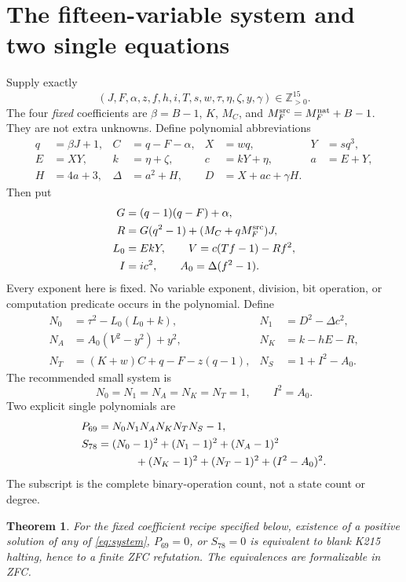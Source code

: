 \documentclass[11pt]{article}
\newtheorem{theorem}{Theorem}
\newcommand{\Pos}{\mathbb Z_{>0}}
\begin{document}
\section{The fifteen-variable system and two single equations}
Supply exactly
\[
(J,F,\alpha,z,f,h,i,T,s,w,\tau,\eta,\zeta,y,\gamma)\in\Pos^{15}.
\]
The four \emph{fixed} coefficients are $\beta=B-1$, $K$, $M_C$, and
$M_F^{\rm src}=M_F^{\rm nat}+B-1$. They are not extra unknowns.
Define polynomial abbreviations
\begin{align*}
q&=\beta J+1,&C&=q-F-\alpha,&X&=wq,&Y&=sq^3,\\
E&=XY,&k&=\eta+\zeta,&c&=kY+\eta,&a&=E+Y,\\
H&=4a+3,&\Delta&=a^2+H,&D&=X+ac+\gamma H.
\end{align*}
Then put
\begin{align*}
G&=(q-1)(q-F)+\alpha,\\
R&=G(q^2-1)+(M_C+qM_F^{\rm src})J,\\
L_0&=EkY,\qquad V=c(Tf-1)-Rf^2,\\
I&=ic^2,\qquad A_0=\Delta(f^2-1).
\end{align*}
Every exponent here is fixed. No variable exponent, division, bit operation, or computation predicate occurs in the polynomial. Define
\begin{align*}
N_0&=\tau^2-L_0(L_0+k),& N_1&=D^2-\Delta c^2,\\
N_A&=A_0(V^2-y^2)+y^2,& N_K&=k-hE-R,\\
N_T&=(K+w)C+q-F-z(q-1),&N_S&=1+I^2-A_0.
\end{align*}
The recommended small system is
\begin{equation}\label{eq:system}
\boxed{N_0=N_1=N_A=N_K=N_T=1,\qquad I^2=A_0.}
\end{equation}
Two explicit single polynomials are
\begin{align}
P_{69}&=N_0N_1N_AN_KN_TN_S-1,\label{eq:product}\\
S_{78}&=(N_0-1)^2+(N_1-1)^2+(N_A-1)^2\notag\\
&\hspace{12mm}+(N_K-1)^2+(N_T-1)^2+(I^2-A_0)^2.\label{eq:sos}
\end{align}
The subscript is the complete binary-operation count, not a state count or degree.

\begin{theorem}\label{thm:main}
For the fixed coefficient recipe specified below, existence of a positive solution of any of \eqref{eq:system}, $P_{69}=0$, or $S_{78}=0$ is equivalent to blank K215 halting, hence to a finite ZFC refutation. The equivalences are formalizable in ZFC.
\end{theorem}
\end{document}
